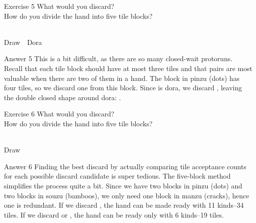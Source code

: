 \vfill


\begin{itembox}[l]{Exercise 5}
What would you discard? \\
\vsp
How do you divide the hand into five tile blocks?

\bp
{}~~\\
\hfill\footnotesize{Draw~~{\jap Dora}~~~~~~~}
\ep
\end{itembox}

\newpage

\begin{itembox}[r]{Answer 5}
\emj
This is a bit difficult, as there are so many closed-wait protoruns. Recall that each tile block should have at most three tiles and that pairs are most valuable when there are two of them in a hand.
The block in {\jap pinzu} (dots) has four tiles, so we discard one from this block. Since {\LARGE{}} is {\jap dora}, we discard {\LARGE{}}, leaving the double closed shape around {\jap dora}: {\LARGE{}}.
\end{itembox}

\vfill

\begin{itembox}[l]{Exercise 6}
What would you discard? \\
\vsp
How do you divide the hand into five tile blocks?

\bp
{}~\\
\hfill\footnotesize{Draw~~~~~~~~~~~}
\ep
\end{itembox}

\newpage

\begin{itembox}[r]{Answer 6}
\emj
Finding the best discard by actually comparing tile acceptance counts for each possible discard candidate is super tedious. The five-block method simplifies the process quite a bit. Since we have two blocks in {\jap pinzu} (dots) and two blocks in {\jap souzu} (bamboos), we only need one block in {\jap manzu} (cracks), hence one {\LARGE{}} is redundant. If we discard {\LARGE{}}, the hand can be made ready with 11 kinds--34 tiles. If we discard {\LARGE{} } or {\LARGE{}}, the hand can be ready only with 6 kinds--19 tiles.
\end{itembox}

